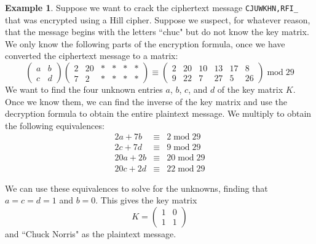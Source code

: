 \documentclass{book}
\theoremstyle{plain}
\theoremstyle{definition}
\newtheorem{example}[theorem]{Example}
\newcommand{\ciphertext}[1]{\texttt{#1}} %
\renewcommand{\mod}{\operatorname{mod}}
\renewcommand{\mod}{\operatorname{mod}}
\begin{document}
\begin{example}
Suppose we want to crack the ciphertext message \ciphertext{CJUWKHN,RFI\_} that was encrypted using a Hill cipher. Suppose we suspect, for whatever reason, that the message begins with the letters ``chuc" but do not know the key matrix. We only know the following parts of the encryption formula, once we have converted the ciphertext message to a matrix: $$\begin{pmatrix} a & b \\ c & d \end{pmatrix}\begin{pmatrix} 2 & 20 & * & * & * & * \\ 7 & 2 & * & * & * & * \end{pmatrix} \equiv \begin{pmatrix} 2 & 20 & 10 & 13 & 17 & 8 \\ 9 & 22 & 7 & 27 & 5 & 26 \end{pmatrix} \mod 29$$
We want to find the four unknown entries $a$, $b$, $c$, and $d$ of the key matrix $K$. Once we know them, we can find the inverse of the key matrix and use the decryption formula to obtain the entire plaintext message. We multiply to obtain the following equivalences:
\begin{eqnarray*}
2a+7b &\equiv& 2 \mod 29 \\
2c+7d &\equiv& 9 \mod 29 \\
20a+2b &\equiv& 20 \mod 29 \\
20c+2d &\equiv& 22 \mod 29
\end{eqnarray*}

We can use these equivalences to solve for the unknowns, finding that $a = c = d = 1$ and $b = 0$. This gives the key matrix $$K = \begin{pmatrix} 1 & 0 \\ 1 & 1 \end{pmatrix}$$ and ``Chuck Norris" as the plaintext message.
\end{example}
\end{document}
